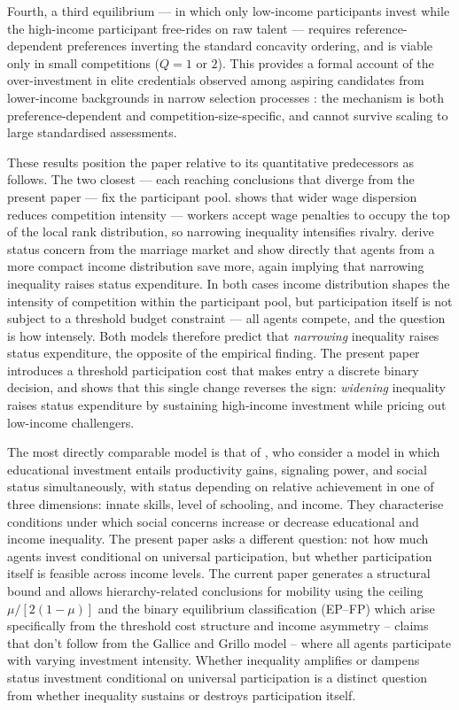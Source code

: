 \documentclass[
    oneside,
    fontsize=10pt,leqno]{article}
\begin{document}
Fourth, a third equilibrium --- in which only low-income
participants invest while the high-income participant free-rides on
raw talent --- requires reference-dependent preferences inverting
the standard concavity ordering, and is viable only in small
competitions ($Q = 1$ or $2$). This provides a formal account of
the over-investment in elite credentials observed among aspiring
candidates from lower-income backgrounds in narrow selection
processes \citep{Rivera2015Pedigree}: the mechanism
is both preference-dependent and competition-size-specific, and
cannot survive scaling to large standardised assessments.

These results position the paper relative to its quantitative
predecessors as follows. The two closest --- each reaching conclusions
that diverge from the present paper --- fix the participant pool.
\citet{FrankAER1984} shows that wider wage dispersion reduces
competition intensity --- workers accept wage penalties to occupy
the top of the local rank distribution, so narrowing inequality
intensifies rivalry. \citet{ColeMailaithPostlewaite1992} derive
status concern from the marriage market and show directly that
agents from a more compact income distribution save more, again
implying that narrowing inequality raises status expenditure. In
both cases income distribution shapes the intensity of competition
within the participant pool, but participation itself is not
subject to a threshold budget constraint --- all agents compete,
and the question is how intensely. Both models therefore predict
that \emph{narrowing} inequality raises status expenditure, the
opposite of the empirical finding. The present paper introduces a
threshold participation cost that makes entry a discrete binary
decision, and shows that this single change reverses the sign:
\emph{widening} inequality raises status expenditure by sustaining
high-income investment while pricing out low-income challengers.

The most directly comparable model is that of
\citet{GalliceGrillo2019}, who consider a model in which
educational investment entails productivity gains, signaling power,
and social status simultaneously, with status depending on relative
achievement in one of three dimensions: innate skills, level of
schooling, and income. They characterise conditions under which
social concerns increase or decrease educational and income
inequality. The present paper asks a different question: not how much agents invest
conditional on universal participation, but whether participation
itself is feasible across income levels. The current paper generates a structural bound and allows hierarchy-related conclusions for mobility using the ceiling $\mu/[2(1-\mu)]$ and the binary equilibrium classification (EP--FP) which arise specifically from the threshold cost structure and income asymmetry -- claims that don't follow from the Gallice and Grillo model -- where all agents participate with varying investment intensity. Whether inequality amplifies or
dampens status investment conditional on universal participation is
a distinct question from whether inequality sustains or destroys
participation itself.
\end{document}

